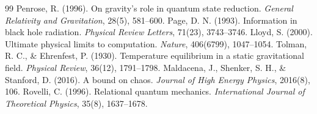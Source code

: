\documentclass[11pt,a4paper]{article}
\begin{document}
\begin{thebibliography}{99}
 Penrose, R. (1996). On gravity's role in quantum state reduction. \textit{General Relativity and Gravitation}, 28(5), 581--600.
 Page, D. N. (1993). Information in black hole radiation. \textit{Physical Review Letters}, 71(23), 3743--3746.
 Lloyd, S. (2000). Ultimate physical limits to computation. \textit{Nature}, 406(6799), 1047--1054.
 Tolman, R. C., \& Ehrenfest, P. (1930). Temperature equilibrium in a static gravitational field. \textit{Physical Review}, 36(12), 1791--1798.
 Maldacena, J., Shenker, S. H., \& Stanford, D. (2016). A bound on chaos. \textit{Journal of High Energy Physics}, 2016(8), 106.
 Rovelli, C. (1996). Relational quantum mechanics. \textit{International Journal of Theoretical Physics}, 35(8), 1637--1678.
\end{thebibliography}
\end{document}
